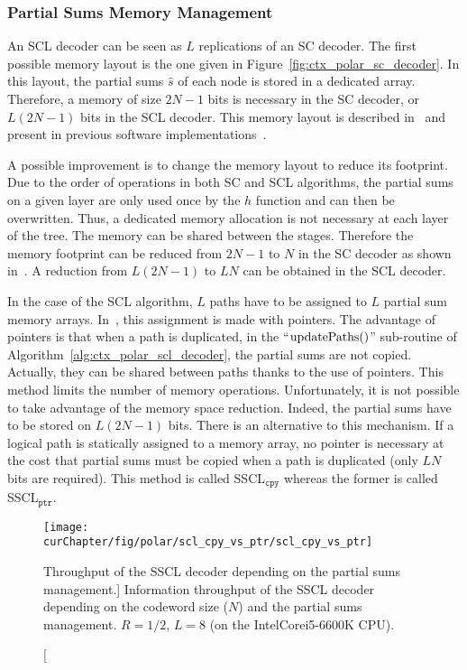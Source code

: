 \subsubsection{Partial Sums Memory Management}
\label{sec:opt_polar_scl_partial_sum}

An SCL decoder can be seen as $L$ replications of an SC decoder. The first
possible memory layout is the one given in
Figure~\ref{fig:ctx_polar_sc_decoder}. In this layout, the partial sums
$\hat{s}$ of each node is stored in a dedicated array. Therefore, a memory of
size $2N-1$ bits is necessary in the SC decoder, or $L(2N -1)$ bits in the SCL
decoder. This memory layout is described in~\cite{Tal2011} and present in
previous software implementations~\cite{Sarkis2014b,Sarkis2016,Shen2016}.

A possible improvement is to change the memory layout to reduce its footprint.
Due to the order of operations in both SC and SCL algorithms, the partial sums
on a given layer are only used once by the $h$ function and can then be
overwritten. Thus, a dedicated memory allocation is not necessary at each layer
of the tree. The memory can be shared between the stages. Therefore the memory
footprint can be reduced from $2N-1$ to $N$ in the SC decoder as shown
in~\cite{Leroux2013}. A reduction from $L(2N -1)$ to $LN$ can be obtained in the
SCL decoder.

In the case of the SCL algorithm, $L$ paths have to be assigned to $L$ partial
sum memory arrays. In~\cite{Tal2011}, this assignment is made with pointers. The
advantage of pointers is that when a path is duplicated, in the
``$\operatorname*{updatePaths}()$'' sub-routine of Algorithm~\ref{alg:ctx_polar_scl_decoder},
the partial sums are not copied. Actually, they can be shared between paths
thanks to the use of pointers. This method limits the number of memory
operations. Unfortunately, it is not possible to take advantage of the memory
space reduction. Indeed, the partial sums have to be stored on $L(2N -1)$ bits.
There is an alternative to this mechanism. If a logical path is statically
assigned to a memory array, no pointer is necessary at the cost that partial
sums must be copied when a path is duplicated (only $LN$ bits are required).
This method is called SSCL$_{\texttt{cpy}}$ whereas the former is called
SSCL$_{\texttt{ptr}}$.

\begin{figure}[htp]
  \centering
  \texttt{[image: \\curChapter/fig/polar/scl\_cpy\_vs\_ptr/scl\_cpy\_vs\_ptr]}
  \caption
    [Throughput of the SSCL decoder depending on the partial sums management.]
    {Information throughput of the SSCL decoder depending on the codeword
    size ($N$) and the partial sums management. $R = 1 / 2$, $L = 8$ (on the
    Intel\R Core\TM i5-6600K CPU).}
  \label{plot:opt_polar_scl_cpy_vs_ptr}
\end{figure}

